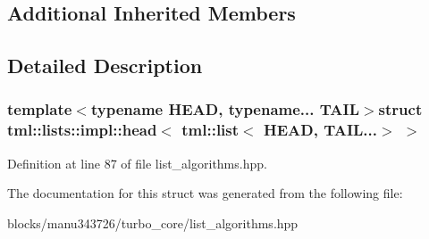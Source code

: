 \subsection*{Additional Inherited Members}


\subsection{Detailed Description}
\subsubsection*{template$<$typename H\+E\+A\+D, typename... T\+A\+I\+L$>$struct tml\+::lists\+::impl\+::head$<$ tml\+::list$<$ H\+E\+A\+D, T\+A\+I\+L...$>$ $>$}



Definition at line 87 of file list\+\_\+algorithms.\+hpp.



The documentation for this struct was generated from the following file\+:\begin{DoxyCompactItemize}
\item 
blocks/manu343726/turbo\+\_\+core/list\+\_\+algorithms.\+hpp\end{DoxyCompactItemize}
